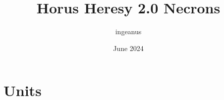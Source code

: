 \documentclass{article}
\title{Horus Heresy 2.0 Necrons}
\author{ingeanus}
\date{June 2024}
\begin{document}
	\renewcommand\thesection{}
	\renewcommand\thesubsection{}
	\renewcommand\thesubsubsection{}
	\contourlength{0.5pt} %
	
	\maketitle
	
	\tableofcontents
	
	\newpage
	
	
	\newpage
	
	
	\newpage
	
	
	\newpage
	
	
	\newpage
	\section{Units}
	
	
	\newpage
	
	
	\newpage
	
	
	\newpage
	
	
	
	
	
	\newpage
	
	
\end{document}
